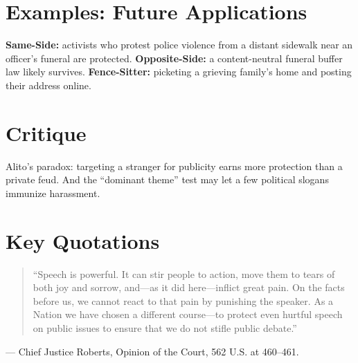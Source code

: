 \documentclass[12pt]{article}
\begin{document}
\section{Examples: Future Applications}
\textbf{Same-Side:} activists who protest police violence from a distant sidewalk near an officer's funeral are protected. \textbf{Opposite-Side:} a content-neutral funeral buffer law likely survives. \textbf{Fence-Sitter:} picketing a grieving family's home and posting their address online.

\section{Critique}
Alito's paradox: targeting a stranger for publicity earns more protection than a private feud. And the ``dominant theme'' test may let a few political slogans immunize harassment.

\section{Key Quotations}
\begin{quote}
``Speech is powerful. It can stir people to action, move them to tears of both joy and sorrow, and---as it did here---inflict great pain. On the facts before us, we cannot react to that pain by punishing the speaker. As a Nation we have chosen a different course---to protect even hurtful speech on public issues to ensure that we do not stifle public debate.''
\end{quote}
\noindent --- Chief Justice Roberts, Opinion of the Court, 562 U.S. at 460--461.
\end{document}
